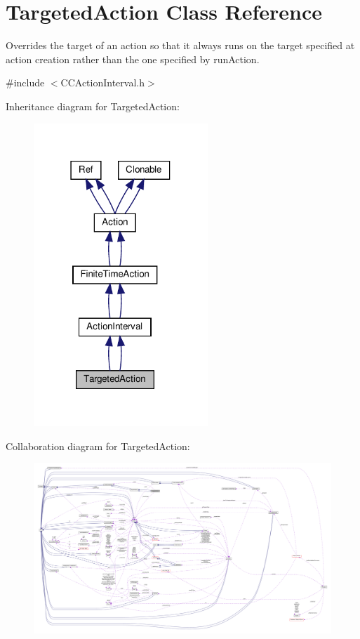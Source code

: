\hypertarget{classTargetedAction}{}\section{Targeted\+Action Class Reference}
\label{classTargetedAction}


Overrides the target of an action so that it always runs on the target specified at action creation rather than the one specified by run\+Action.  




{\ttfamily \#include $<$C\+C\+Action\+Interval.\+h$>$}



Inheritance diagram for Targeted\+Action\+:
\nopagebreak
\begin{figure}[H]
\begin{center}
\leavevmode
\includegraphics[width=186pt]{classTargetedAction__inherit__graph}
\end{center}
\end{figure}


Collaboration diagram for Targeted\+Action\+:
\nopagebreak
\begin{figure}[H]
\begin{center}
\leavevmode
\includegraphics[width=350pt]{classTargetedAction__coll__graph}
\end{center}
\end{figure}
